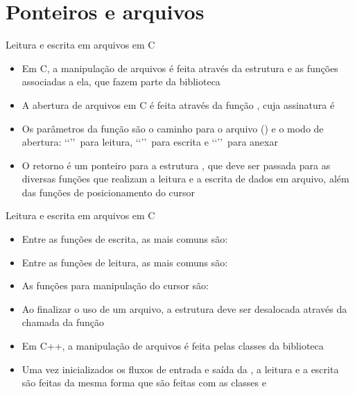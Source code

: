 \section{Ponteiros e arquivos}

\begin{frame}[fragile]{Leitura e escrita em arquivos em C}

	\begin{itemize}
		\item Em C, a manipulação de arquivos é feita através da estrutura 
         e as funções associadas a ela, que fazem parte da biblioteca 

		\item A abertura de arquivos em C é feita através da função , cuja 
        assinatura é
		\item Os parâmetros da função  são o caminho para o arquivo () 
        e o modo de abertura: \lq\lq {}\rq\rq\ para {leitura}, \lq\lq {}\rq\rq\ 
        para escrita e \lq\lq {}\rq\rq\ para anexar

		\item O retorno é um ponteiro para a estrutura , que deve ser passada         para as diversas funções que realizam a leitura e a escrita de dados em arquivo, além das 
        funções de posicionamento do cursor

	\end{itemize}

\end{frame}

\begin{frame}[fragile]{Leitura e escrita em arquivos em C}

	\begin{itemize}
		\item Entre as funções de escrita, as mais comuns são: 

		\item Entre as funções de leitura, as mais comuns são: 

		\item As funções para manipulação do cursor são: 

		\item Ao finalizar o uso de um arquivo, a estrutura  deve ser 
        desalocada através da chamada da função \code{c}{fclose()}

		\item Em C++, a manipulação de arquivos é feita pelas classes da biblioteca 

        \item Uma vez inicializados os fluxos de entrada e saída da , a leitura
        e a escrita são feitas da mesma forma que são feitas com as classes \code{c}{cin} e 
        \code{c}{cout}
	\end{itemize}

\end{frame}

